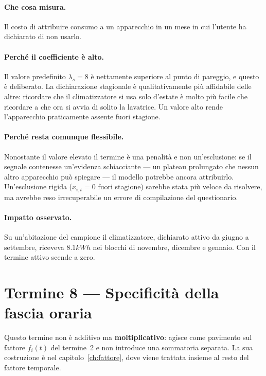 \paragraph{Che cosa misura.} Il costo di attribuire consumo a un apparecchio in un mese in cui
l'utente ha dichiarato di non usarlo.

\paragraph{Perché il coefficiente è alto.} Il valore predefinito $\lambda_s = 8$ è nettamente
superiore al punto di pareggio, e questo è deliberato. La dichiarazione stagionale è
qualitativamente più affidabile delle altre: ricordare che il climatizzatore si usa solo d'estate
è molto più facile che ricordare a che ora si avvia di solito la lavatrice. Un valore alto rende
l'apparecchio praticamente assente fuori stagione.

\paragraph{Perché resta comunque flessibile.} Nonostante il valore elevato il termine è una
penalità e non un'esclusione: se il segnale contenesse un'evidenza schiacciante --- un plateau
prolungato che nessun altro apparecchio può spiegare --- il modello potrebbe ancora attribuirlo.
Un'esclusione rigida ($x_{i,t} = 0$ fuori stagione) sarebbe stata più veloce da risolvere, ma
avrebbe reso irrecuperabile un errore di compilazione del questionario.

\paragraph{Impatto osservato.} Su un'abitazione del campione il climatizzatore, dichiarato attivo
da giugno a settembre, riceveva $8.1\unit{kWh}$ nei blocchi di novembre, dicembre e gennaio.
Con il termine attivo scende a zero.

\section{Termine 8 --- Specificità della fascia oraria}

Questo termine non è additivo ma \textbf{moltiplicativo}: agisce come pavimento sul fattore
$f_i(t)$ del termine~2 e non introduce una sommatoria separata. La sua costruzione è nel
capitolo~\ref{ch:fattore}, dove viene trattata insieme al resto del fattore temporale.

